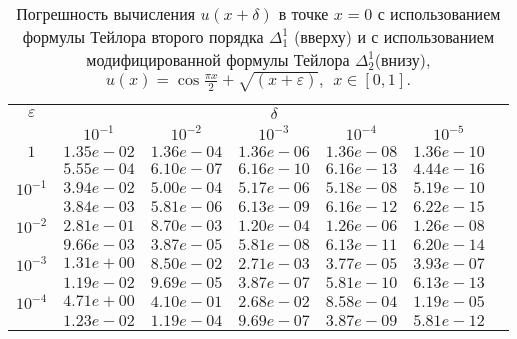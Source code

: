 \documentclass[10pt,twoside]{uz_kgu}
\begin{document}
\begin{table} [!htb]
		\caption {Погрешность вычисления $u(x+ \delta)$ в точке $x=0$ с использованием формулы Тейлора второго порядка $\Delta_1^1$ (вверху) и с использованием модифицированной формулы Тейлора $\Delta_2^1$(внизу), 
			$u(x)=  \cos \frac{\pi x}{2} + \sqrt{(x+\varepsilon)} ,\ \    x\in [0,1].$}
	\begin{center}
		\begin{tabular}{|c|c|c|c|c|c|c}
			\cline{1-6} $\varepsilon$ & \multicolumn{5}{c|}{$\delta$} \\
			\cline{2-6} &$10^{-1}$ & $10^{-2}$ & $10^{-3}$  & $10^{-4}$& $10^{-5}$\\
			\cline{1-6}
			$1$
			&$1.35e-02$&$1.36e-04$&$1.36e-06$&$1.36e-08$& $1.36e-10$\\
			&$5.55e-04$&$6.10e-07$&$6.16e-10$&$6.16e-13$& $4.44e-16$\\
			\cline{1-6}
			$10^{-1}$
			&$3.94e-02$&$5.00e-04$&$5.17e-06$&$5.18e-08$&$5.19e-10$\\
			&$3.84e-03$&$5.81e-06$&$6.13e-09$&$6.16e-12$&$6.22e-15$\\
			\cline{1-6}
			$10^{-2}$
			&$2.81e-01$&$8.70e-03$&$1.20e-04$&$1.26e-06$&$1.26e-08$\\
			&$9.66e-03$&$3.87e-05$&$5.81e-08$&$6.13e-11$&$6.20e-14$\\
			\cline{1-6}
			$10^{-3}$
			&$1.31e+00$&$8.50e-02$&$2.71e-03$&$3.77e-05$&$3.93e-07$\\
			&$1.19e-02$&$9.69e-05$&$3.87e-07$&$5.81e-10$&$6.13e-13$\\
			\cline{1-6}
			$10^{-4}$
			&$4.71e+00$&$4.10e-01$&$2.68e-02$&$8.58e-04$&$1.19e-05$\\
			&$1.23e-02$&$1.19e-04$&$9.69e-07$&$3.87e-09$&$5.81e-12$\\
			\cline{1-6}
		\end{tabular}
	\end{center}
\end{table}
\end{document}
